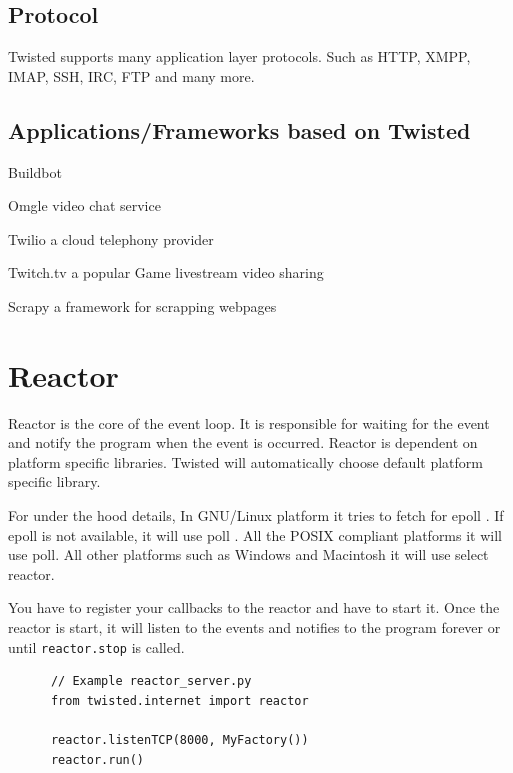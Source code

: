 \documentclass{article}
\begin{document}
    \subsection{Protocol}
      Twisted supports many application layer protocols. Such as HTTP, XMPP,
      IMAP, SSH, IRC, FTP and many more.

    \subsection{Applications/Frameworks based on Twisted}

    \begin{iteritems}
      \item Buildbot
      \item Omgle video chat service
      \item Twilio a cloud telephony provider
      \item Twitch.tv a popular Game livestream video sharing
      \item Scrapy a framework for scrapping webpages
    \end{iteritems}

  \section{Reactor}
    Reactor is the core of the event loop. It is responsible for waiting for
    the event and notify the program when the event is occurred. Reactor is
    dependent on platform specific libraries. Twisted will automatically choose
    default platform specific library.

    For under the hood details, In GNU/Linux platform it tries to fetch for
    epoll \cite{epoll}.  If epoll \cite{epoll} is not available, it will use
    poll \cite{poll}. All the POSIX compliant platforms it will use poll. All
    other platforms such as Windows and Macintosh it will use select reactor.

    You have to register your callbacks to the reactor and have to start it.
    Once the reactor is start, it will listen to the events and notifies to the
    program forever or until \texttt{reactor.stop} is called.

    \begin{verbatim}
      // Example reactor_server.py
      from twisted.internet import reactor

      reactor.listenTCP(8000, MyFactory())
      reactor.run()
    \end{verbatim}
\end{document}
